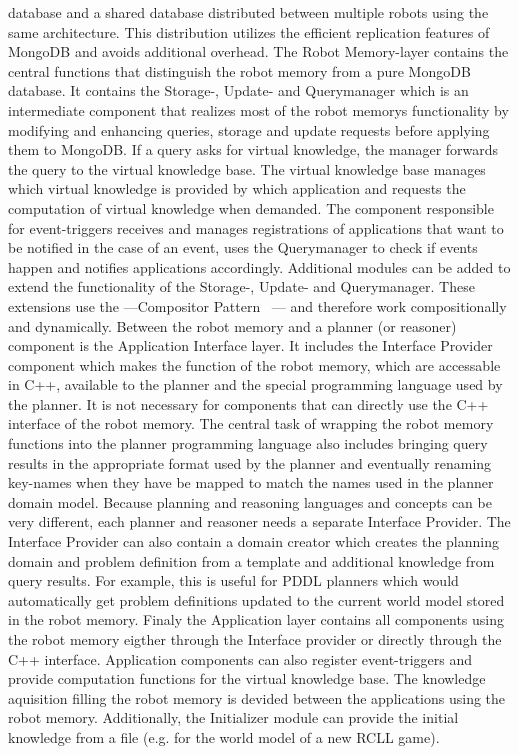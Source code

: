 \documentclass[a4paper,11pt]{article}
\begin{document}
database and a shared database distributed between multiple robots
using the same architecture. This distribution utilizes the efficient
replication features of MongoDB and avoids additional overhead. The
Robot Memory-layer contains the central functions that distinguish the
robot memory from a pure MongoDB database. It contains the Storage-,
Update- and Querymanager which is an intermediate component that
realizes most of the robot memorys functionality by modifying and
enhancing queries, storage and update requests before applying them to
MongoDB. If a query asks for virtual knowledge, the manager forwards
the query to the virtual knowledge base. The virtual knowledge base
manages which virtual knowledge is provided by which application and
requests the computation of virtual knowledge when demanded. The
component responsible for event-triggers receives and manages
registrations of applications that want to be notified in the case of
an event, uses the Querymanager to check if events happen and notifies
applications accordingly. Additional modules can be added to extend
the functionality of the Storage-, Update- and Querymanager. These
extensions use the ---Compositor
Pattern~\cite{design-patterns} --- and therefore work
compositionally and dynamically. Between the robot memory and a
planner (or reasoner) component is the Application Interface layer. It
includes the Interface Provider component which makes the function of
the robot memory, which are accessable in C++, available to the
planner and the special programming language used by the planner. It
is not necessary for components that can directly use the C++
interface of the robot memory. The central task of wrapping the robot
memory functions into the planner programming language also includes
bringing query results in the appropriate format used by the planner
and eventually renaming key-names when they have be mapped to match
the names used in the planner domain model. Because planning and
reasoning languages and concepts can be very different, each planner
and reasoner needs a separate Interface Provider. The Interface
Provider can also contain a domain creator which creates the planning
domain and problem definition from a template and additional knowledge
from query results. For example, this is useful for PDDL planners
which would automatically get problem definitions updated to the
current world model stored in the robot memory. Finaly the Application
layer contains all components using the robot memory eigther through
the Interface provider or directly through the C++
interface. Application components can also register event-triggers and
provide computation functions for the virtual knowledge base.  The
knowledge aquisition filling the robot memory is devided between the
applications using the robot memory. Additionally, the Initializer
module can provide the initial knowledge from a file (e.g. for the
world model of a new RCLL game).
\end{document}

